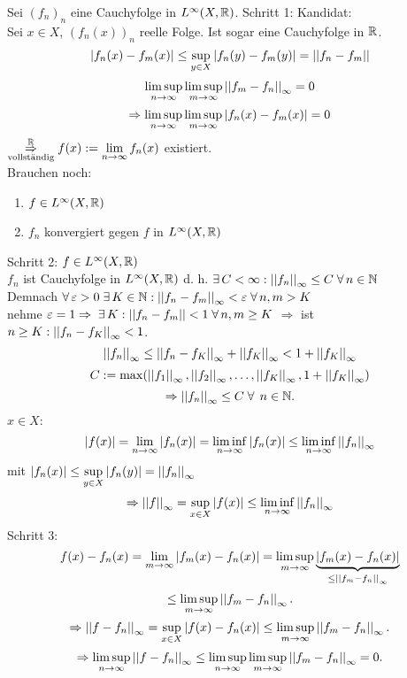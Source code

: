 \documentclass[../ana2.tex]{subfiles}
\begin{document}
\begin{bew}
    Sei \( (f_n)_n \) eine Cauchyfolge in 
    \( L^\infty(X, \mathbb{R}) \).
    Schritt 1: Kandidat: \\
    Sei \( x \in X \), \( (f_n(x))_n \) reelle Folge.
    Ist sogar eine Cauchyfolge in \(\mathbb{R}\).
    \[ \left|f_n(x) - f_m(x)\right| \leq \underset{y \in X}{\sup} 
    \left|f_n(y)-f_m(y)\right| = \left|\left|f_n-f_m\right|\right| \]
    \[ \limsup\limits_{n\rightarrow\infty} \limsup\limits_{m\rightarrow\infty} \left|\left|f_m - f_n\right|\right|_\infty 
    = 0 \]
    \[ \Rightarrow \limsup\limits_{n\rightarrow\infty} \limsup\limits_{m\rightarrow\infty} 
    \left|f_n(x)-f_m(x)\right| = 0 \]
    \( \overset{\mathbb{R}}{\underset{\text{vollständig}}{\Rightarrow}} 
    f(x) := \lim\limits_{n\rightarrow\infty} f_n(x)\) existiert. \\
    Brauchen noch: 
    \begin{enumerate}
        \item \( f \in L^\infty(X, \mathbb{R}) \)
        \item \(f_n\) konvergiert gegen \(f\) in 
        \( L^\infty(X, \mathbb{R}) \)
    \end{enumerate}
    Schritt 2: \(f \in L^\infty(X, \mathbb{R})\) \\
    \( f_n \) ist Cauchyfolge in \(L^\infty(X,\mathbb{R})\)
    d. h. \( \exists C < \infty: \norm{f_n}_\infty 
    \leq C \; \forall n \in \N \) \\
    Demnach \( \forall \varepsilon > 0 \; \exists K \in \N: 
    \norm{f_n-f_m}_\infty < \varepsilon \; \forall n,m > K \) \\
    nehme \( \varepsilon = 1 \Rightarrow \; \exists K: \norm{f_n-f_m} 
    < 1 \; \forall n,m \geq K \)
    \( \Rightarrow \) ist \( n \geq K: 
    \left|\left|f_n - f_K\right|\right|_\infty < 1 \).
    \[ \left|\left|f_n\right|\right|_\infty \leq 
    \left|\left| f_n - f_K \right|\right|_\infty 
    + \left|\left|f_K\right|\right|_\infty < 1 + \left|\left|f_K\right|\right|_\infty \]
    \[ C := \max( \left|\left|f_1\right|\right|_\infty, 
    \left|\left|f_2\right|\right|_\infty, \ldots, 
    \left|\left|f_K\right|\right|_\infty, 1 + \left|\left|f_K\right|\right|_\infty ) \]
    \[ \Rightarrow \norm{f_n}_\infty \leq C \;\forall \; 
    n\in\N. \]
    \(x \in X\):
    \[ \left|f(x)\right| = \lim\limits_{n\rightarrow\infty} \left|f_n(x)\right| 
    = \liminf\limits_{n\rightarrow\infty} \left|f_n(x)\right|
    \leq \liminf\limits_{n\rightarrow\infty} \left|\left|f_n\right|\right|_\infty \]
    mit \( \left|f_n(x)\right| 
    \leq \underset{y \in X}{\sup} \left|f_n(y)\right| 
    = \left|\left|f_n\right|\right|_\infty \)
    \[ \Rightarrow \left|\left|f\right|\right|_\infty 
    = \underset{x \in X}{\sup} \left|f(x)\right|
    \leq \liminf\limits_{n\rightarrow\infty} \left|\left|f_n\right|\right|_\infty \]
    Schritt 3:
    \[ f(x) - f_n(x) = 
    \lim\limits_{m\rightarrow\infty} \left| f_m(x) - f_n(x) \right|
    = \limsup\limits_{m\rightarrow\infty} \underbrace{\left|f_m(x) - f_n(x)\right|}
    _{\leq \left|\left|f_m - f_n\right|\right|_\infty} \]
    \[ \leq \limsup\limits_{m\rightarrow\infty} \left|\left|f_m - f_n\right|\right|_\infty. \]
    \[ \Rightarrow \left|\left|f - f_n\right|\right|_\infty 
    = \underset{x \in X}{\sup} \left|f(x) - f_n(x)\right| 
    \leq \limsup\limits_{m\rightarrow\infty} \left|\left|f_m - f_n\right|\right|_\infty. \]
    \[ \Rightarrow \limsup\limits_{n\rightarrow\infty} \left|\left|f-f_n\right|\right|_\infty 
    \leq \limsup\limits_{n\rightarrow\infty}\limsup\limits_{m\rightarrow\infty} 
    \left|\left|f_m - f_n\right|\right|_\infty = 0. \]
\end{bew}
\end{document}
